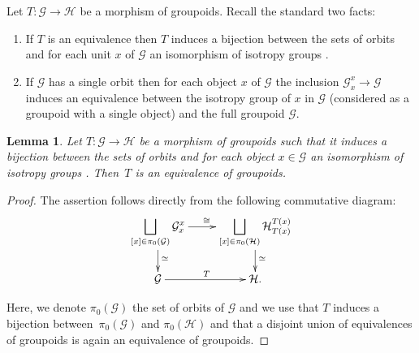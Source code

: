 \documentclass[pdftex]{sigma}
\numberwithin{equation}{section}
\newtheorem{Lemma}[Theorem]{Lemma}
\begin{document}
	\begin{Remark}\label{rem:grp_equv}
Let $T\colon \mathcal{G}\to \mathcal{H}$ be a morphism of groupoids.
Recall the standard two facts:
		\begin{enumerate}\itemsep=0pt
			\item[(1)] If $T$ is an equivalence then $T$ induces a bijection between the sets of orbits and for
			each unit $x$ of $\mathcal{G}$ an isomorphism of isotropy groups
			.
			\item[(2)] If $\mathcal{G}$ has a single orbit then for each object $x$ of $\mathcal{G}$ the
			inclusion $\mathcal{G}_x^x\to \mathcal{G}$ induces an equivalence between the isotropy group
			of $x$ in $\mathcal{G}$ (considered as a groupoid with a single object) and the full groupoid $\mathcal{G}$.
		\end{enumerate}
	\end{Remark}
	
	\begin{Lemma}\label{lem:groupoid_eq}
		Let $T\colon \mathcal{G}\to \mathcal{H}$ be a morphism of groupoids such that it induces a
		bijection between the sets of orbits and for each object $x\in \mathcal{G}$ an
		isomorphism of isotropy groups . Then~$T$
		is an equivalence of groupoids.
	\end{Lemma}
	\begin{proof}
		The assertion follows directly from the following commutative diagram:
		\begin{equation*}
			\xymatrix{\displaystyle\bigsqcup_{[x]\in\pi_0(\mathcal{G})}\mathcal{G}^x_x\ar[r]^{\cong}\ar[d]^(.6){\simeq} &
				\displaystyle\bigsqcup_{[x]\in\pi_0(\mathcal{H})}\mathcal{H}^{T(x)}_{T(x)}\ar[d]^(.6){\simeq}\\
				\mathcal{G}\ar[r]^T&\mathcal{H}.}
		\end{equation*}
		
		Here, we denote $\pi_0(\mathcal{G})$ the set of orbits of $\mathcal{G}$ and we use that $T$
		induces a bijection between~$\pi_0(\mathcal{G})$ and $\pi_0(\mathcal{H})$
		and that a disjoint union of equivalences of groupoids is again an equivalence
		of groupoids.
	\end{proof}
	
\end{document}
